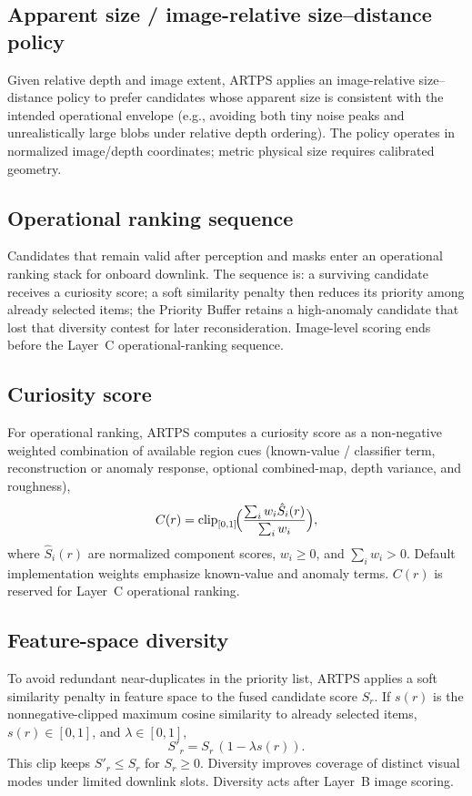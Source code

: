 \subsection{Apparent size / image-relative size--distance policy}
Given relative depth and image extent, ARTPS applies an image-relative size--distance policy
to prefer candidates whose apparent size is consistent with the intended operational envelope
(e.g., avoiding both tiny noise peaks and unrealistically large blobs under relative depth
ordering).
The policy operates in normalized image/depth coordinates; metric physical size requires
calibrated geometry.

\subsection{Operational ranking sequence}
Candidates that remain valid after perception and masks enter an operational ranking
stack for onboard downlink.
The sequence is: a surviving candidate receives a curiosity score; a soft similarity penalty
then reduces its priority among already selected items; the Priority Buffer retains a
high-anomaly candidate that lost that diversity contest for later reconsideration.
Image-level scoring ends before the Layer~C operational-ranking sequence.

\subsection{Curiosity score}
For operational ranking, ARTPS computes a curiosity score as a non-negative weighted
combination of available region cues (known-value / classifier term, reconstruction or
anomaly response, optional combined-map, depth variance, and roughness),
\[
C(r)=\mathrm{clip}_{[0,1]}\!\Bigl(\frac{\sum_i w_i \hat S_i(r)}{\sum_i w_i}\Bigr),
\]
where \(\hat S_i(r)\) are normalized component scores, \(w_i\ge 0\), and \(\sum_i w_i>0\).
Default implementation weights emphasize known-value and anomaly terms.
\(C(r)\) is reserved for Layer~C operational ranking.

\subsection{Feature-space diversity}
To avoid redundant near-duplicates in the priority list, ARTPS applies a soft similarity
penalty in feature space to the fused candidate score \(S_r\).
If \(s(r)\) is the nonnegative-clipped maximum cosine similarity to already selected
items, \(s(r)\in[0,1]\), and \(\lambda\in[0,1]\),
\[
S'_r=S_r\,(1-\lambda s(r)).
\]
This clip keeps \(S'_r\le S_r\) for \(S_r\ge 0\).
Diversity improves coverage of distinct visual modes under limited downlink slots.
Diversity acts after Layer~B image scoring.


